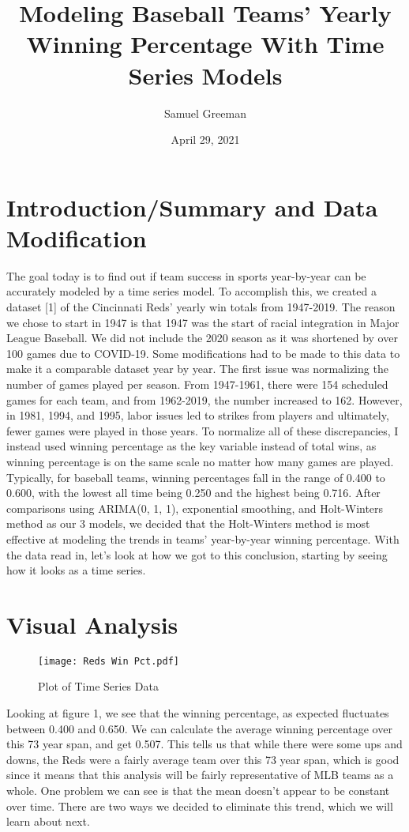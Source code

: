 \documentclass[12pt]{article}
\title{Modeling Baseball Teams' Yearly Winning Percentage With Time Series Models}
\author{Samuel Greeman}
\date{April 29, 2021}
\begin{document}
\maketitle 



\setdefaultleftmargin{0pt}{}{}{}{}{}

\section{Introduction/Summary and Data Modification}\label{sec:intro}
The goal today is to find out if team success in sports year-by-year can be accurately modeled by a time series model. To accomplish this, we created a dataset [1] of the Cincinnati Reds' yearly win totals from 1947-2019. The reason we chose to start in 1947 is that 1947 was the start of racial integration in Major League Baseball. We did not include the 2020 season as it was shortened by over 100 games due to COVID-19. Some modifications had to be made to this data to make it a comparable dataset year by year. The first issue was normalizing the number of games played per season. From 1947-1961, there were 154 scheduled games for each team, and from 1962-2019, the number increased to 162. However, in 1981, 1994, and 1995, labor issues led to strikes from players and ultimately, fewer games were played in those years. To normalize all of these discrepancies, I instead used winning percentage as the key variable instead of total wins, as winning percentage is on the same scale no matter how many games are played. Typically, for baseball teams, winning percentages fall in the range of 0.400 to 0.600, with the lowest all time being 0.250 and the highest being 0.716. After comparisons using ARIMA(0, 1, 1), exponential smoothing, and Holt-Winters method as our 3 models, we decided that the Holt-Winters method is most effective at modeling the trends in teams' year-by-year winning percentage. With the data read in, let's look at how we got to this conclusion, starting by seeing how it looks as a time series.\\

\section{Visual Analysis}\label{sec:chapter}
\begin{figure}[h!]
\centering
\texttt{[image: Reds Win Pct.pdf]}
\caption{Plot of Time Series Data}
\label{fig:Figure 1}
\end{figure} 
Looking at figure 1, we see that the winning percentage, as expected fluctuates between 0.400 and 0.650. We can calculate the average winning percentage over this 73 year span, and get 0.507. This tells us that while there were some ups and downs, the Reds were a fairly average team over this 73 year span, which is good since it means that this analysis will be fairly representative of MLB teams as a whole. One problem we can see is that the mean doesn't appear to be constant over time. There are two ways we decided to eliminate this trend, which we will learn about next. \\
\end{document}
